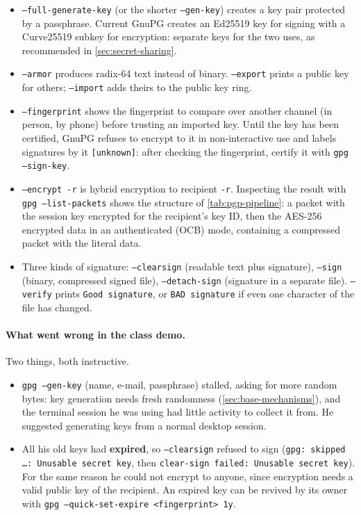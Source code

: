 \begin{itemize}
    \item \texttt{--full-generate-key} (or the shorter \texttt{--gen-key}) creates a key pair protected by a passphrase. Current GnuPG creates an Ed25519 key for signing with a Curve25519 subkey for encryption: separate keys for the two uses, as recommended in \cref{sec:secret-sharing}.
    \item \texttt{--armor} produces radix-64 text instead of binary. \texttt{--export} prints a public key for others; \texttt{--import} adds theirs to the public key ring.
    \item \texttt{--fingerprint} shows the fingerprint to compare over another channel (in person, by phone) before trusting an imported key. Until the key has been certified, GnuPG refuses to encrypt to it in non-interactive use and labels signatures by it \texttt{[unknown]}: after checking the fingerprint, certify it with \texttt{gpg --sign-key}.
    \item \texttt{--encrypt -r} is hybrid encryption to recipient \texttt{-r}. Inspecting the result with \texttt{gpg --list-packets} shows the structure of \cref{tab:pgp-pipeline}: a packet with the session key encrypted for the recipient's key ID, then the AES-256 encrypted data in an authenticated (OCB) mode, containing a compressed packet with the literal data.
    \item Three kinds of signature: \texttt{--clearsign} (readable text plus signature), \texttt{--sign} (binary, compressed signed file), \texttt{--detach-sign} (signature in a separate file). \texttt{--verify} prints \texttt{Good signature}, or \texttt{BAD signature} if even one character of the file has changed.
\end{itemize}

\paragraph{What went wrong in the class demo.} Two things, both instructive.
\begin{itemize}
    \item \texttt{gpg --gen-key} (name, e-mail, passphrase) stalled, asking for more random bytes: key generation needs fresh randomness (\cref{sec:base-mechanisms}), and the terminal session he was using had little activity to collect it from. He suggested generating keys from a normal desktop session.
    \item All his old keys had \textbf{expired}, so \texttt{--clearsign} refused to sign (\texttt{gpg: skipped \dots: Unusable secret key}, then \texttt{clear-sign failed: Unusable secret key}). For the same reason he could not encrypt to anyone, since encryption needs a valid public key of the recipient. An expired key can be revived by its owner with \texttt{gpg --quick-set-expire <fingerprint> 1y}.
\end{itemize}

